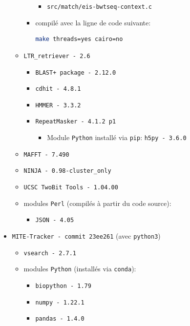 \documentclass[10pt]{article}
\begin{document}
\begin{itemize}
\begin{itemize}
\begin{itemize}
\begin{itemize}
                \item \texttt{src/match/eis-bwtseq-context.c}
            \end{itemize}
            \item compilé avec la ligne de code suivante: 
\begin{lstlisting}[language=bash]
make threads=yes cairo=no
\end{lstlisting}
        \end{itemize}
        \item \texttt{LTR\_retriever - 2.6} %
        \begin{itemize}
            \item \texttt{BLAST+ package - 2.12.0}
            \item \texttt{cdhit - 4.8.1}
            \item \texttt{HMMER - 3.3.2}
            \item \texttt{RepeatMasker - 4.1.2 p1}
            \begin{itemize}
                \item Module \texttt{Python} installé via \texttt{pip}: \texttt{h5py - 3.6.0}
            \end{itemize}
        \end{itemize}
        \item \texttt{MAFFT - 7.490}
        \item \texttt{NINJA - 0.98-cluster\_only}
        \item \texttt{UCSC TwoBit Tools - 1.04.00}
        \item modules \texttt{Perl} (compilés à partir du code source):
        \begin{itemize}
            \item \texttt{JSON - 4.05}
        \end{itemize}
    \end{itemize}
    \item \texttt{MITE-Tracker - commit 23ee261} (avec \texttt{python3})
    \begin{itemize}
        \item \texttt{vsearch - 2.7.1}
        \item modules \texttt{Python} (installés via \texttt{conda}):
        \begin{itemize}
            \item \texttt{biopython - 1.79}
            \item \texttt{numpy - 1.22.1}
            \item \texttt{pandas - 1.4.0}

\end{itemize}
\end{itemize}
\end{itemize}
\end{document}

